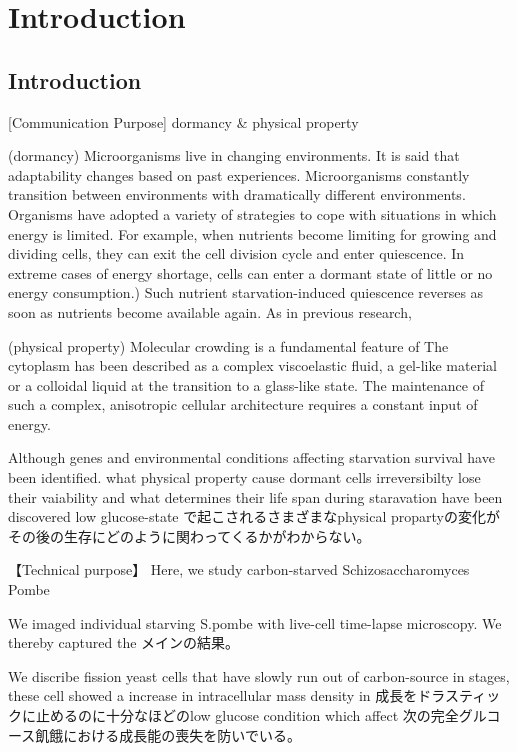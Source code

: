 \chapter{Introduction}

\section{Introduction}
[Communication Purpose] 
dormancy \& physical property

(dormancy)
Microorganisms live in changing environments. It is said that adaptability changes based on past experiences. 
Microorganisms constantly transition between environments with dramatically different environments. 
Organisms have adopted a variety of strategies to cope with situations in which energy is limited. 
For example, when nutrients become limiting for growing and dividing cells, they can exit the cell division cycle and enter quiescence.
In extreme cases of energy shortage, cells can enter a dormant state of little or no energy consumption.)
Such nutrient starvation-induced quiescence reverses as soon as nutrients become available again.
As in previous research, 

(physical property)
Molecular crowding is a fundamental feature of \cite{lohka1985induction}\cite{zhou2008macromolecular}\cite{miermont2013severe}\cite{chen2024viscosity}\cite{neurohr2020relevance}
The cytoplasm has been described as a complex viscoelastic fluid, a gel-like material or a colloidal liquid at the transition to a glass-like state.\cite{nishizawa2017universal}
The maintenance of such a complex, anisotropic cellular architecture requires a constant input of energy. \cite{ebata2023activity}

Although genes and environmental conditions affecting starvation survival have been identified. what physical property cause dormant cells irreversibilty lose their vaiability and what determines their life span during staravation have been discovered
low glucose-state で起こされるさまざまなphysical propartyの変化がその後の生存にどのように関わってくるかがわからない。 


【Technical purpose】
Here, we study carbon-starved {Schizosaccharomyces Pombe}

We imaged individual starving {S.pombe} with live-cell time-lapse microscopy.
We thereby captured the メインの結果。

We discribe fission yeast cells that have slowly run out of carbon-source in stages, these cell showed a increase in intracellular mass density in  成長をドラスティックに止めるのに十分なほどのlow glucose condition which affect 次の完全グルコース飢餓における成長能の喪失を防いでいる。























